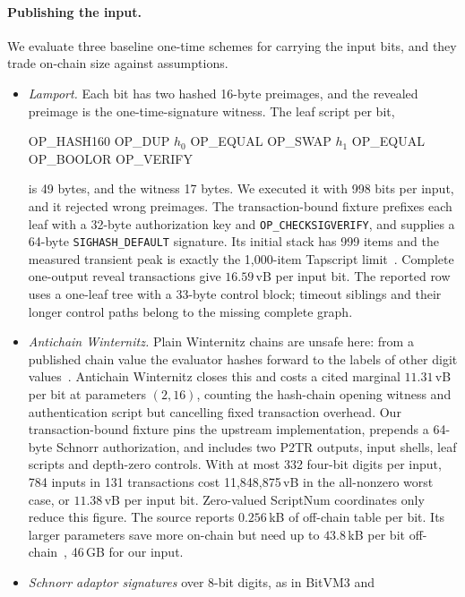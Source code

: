 \documentclass[11pt]{article}
\begin{document}
\paragraph{Publishing the input.} We evaluate three baseline one-time schemes for carrying the input
bits, and they trade on-chain size against assumptions.
\begin{itemize}
  \item \emph{Lamport.} Each bit has two hashed 16-byte preimages, and the
    revealed preimage is the one-time-signature witness. The leaf script
    per bit,
    \begin{center}\ttfamily\small OP\_HASH160 OP\_DUP $h_0$ OP\_EQUAL OP\_SWAP $h_1$ OP\_EQUAL OP\_BOOLOR OP\_VERIFY\end{center}
    is 49 bytes, and the witness 17 bytes. We executed it with 998 bits per
    input, and it rejected wrong preimages. The transaction-bound fixture
    prefixes each leaf with a 32-byte authorization key and
    \texttt{OP\_CHECKSIGVERIFY}, and supplies a 64-byte
    \texttt{SIGHASH\_DEFAULT} signature. Its initial stack has 999 items and
    the measured transient peak is exactly the 1{,}000-item Tapscript
    limit~\cite{bip342}. Complete one-output reveal
    transactions give $16.59$\,vB per input bit. The reported row uses a
    one-leaf tree with a 33-byte control block; timeout siblings and their
    longer control paths belong to the missing complete graph.
  \item \emph{Antichain Winternitz.} Plain Winternitz chains are unsafe here: from
    a published chain value the evaluator hashes forward to the labels of other
    digit values~\cite{antichain26}. Antichain Winternitz closes this and costs
    a cited marginal $11.31$\,vB per bit at parameters $(2,16)$, counting the
    hash-chain opening witness and authentication script but cancelling fixed
    transaction overhead. Our transaction-bound fixture pins the upstream
    implementation, prepends a 64-byte Schnorr authorization, and includes two
    P2TR outputs, input shells, leaf scripts and depth-zero controls. With at
    most 332 four-bit digits per input, 784 inputs in 131 transactions cost
    11{,}848{,}875\,vB in the all-nonzero worst case, or $11.38$\,vB per input
    bit. Zero-valued ScriptNum coordinates only reduce this figure. The source
    reports $0.256$\,kB of off-chain table per bit. Its
    larger parameters save more on-chain but need up to $43.8$\,kB per bit
    off-chain~\cite{antichain26}, 46\,GB for our input.
  \item \emph{Schnorr adaptor signatures} over 8-bit digits, as in BitVM3 and

\end{itemize}
\end{document}
